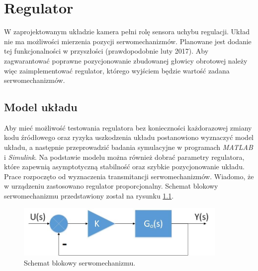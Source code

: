 \chapter{Regulator}
\label{cha:regulator}

W zaprojektowanym układzie kamera pełni rolę sensora uchybu regulacji.
Układ nie ma możliwości mierzenia pozycji serwomechanizmów. Planowane jest dodanie tej funkcjonalności w przyszłości (prawdopodobnie luty 2017).
Aby zagwarantować poprawne pozycjonowanie zbudowanej głowicy obrotowej należy więc zaimplementować regulator, którego wyjściem będzie wartość zadana serwomechanizmów.

\section{Model układu}
\label{sec:modelukladu}

Aby mieć możliwość testowania regulatora bez konieczności każdorazowej zmiany kodu źródłowego oraz ryzyka uszkodzenia układu postanowiono wyznaczyć model układu, a następnie przeprowadzić badania symulacyjne w programach \textit{MATLAB} i \textit{Simulink}.
Na podstawie modelu można również dobrać parametry regulatora, które zapewnią asymptotyczną stabilność oraz szybkie pozycjonowanie układu.
Prace rozpoczęto od wyznaczenia transmitancji serwomechanizmów. Wiadomo, że w urządzeniu zastosowano regulator proporcjonalny.
Schemat blokowy serwomechanizmu przedstawiony został na rysunku \ref{fig:servo}.

\begin{figure}[h]
	\centering
	\includegraphics[width=4in]{servo.jpg}
	\caption{Schemat blokowy serwomechanizmu.}
	\label{fig:servo}
\end{figure}

